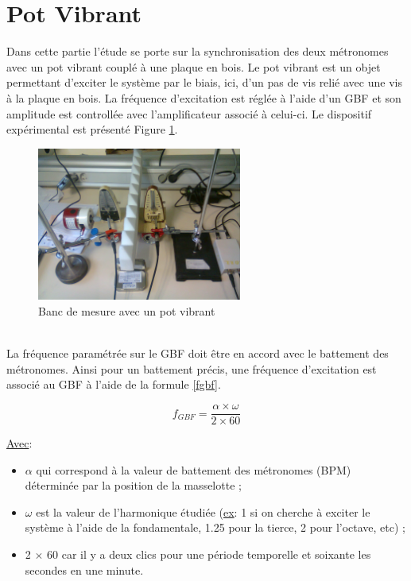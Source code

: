 \documentclass[a4paper,11pt]{report}
\begin{document}
\section{Pot Vibrant}
Dans cette partie l'étude se porte sur la synchronisation des deux métronomes avec un pot vibrant couplé à une plaque en bois. Le pot vibrant est un objet permettant d'exciter le système par le biais, ici, d'un pas de vis relié avec une vis à la plaque en bois. La fréquence d'excitation est réglée à l'aide d'un GBF et son amplitude est controllée avec l'amplificateur associé à celui-ci. Le dispositif expérimental est présenté Figure \ref{BancPot}.\\
\begin{figure}[h]
\centering
\includegraphics[width=0.6\textwidth]{Bancpotvibrant}
\caption{Banc de mesure avec un pot vibrant}\label{BancPot}
\end{figure}\\
La fréquence paramétrée sur le GBF doit être en accord avec le battement des métronomes. Ainsi pour un battement précis, une fréquence d'excitation est associé au GBF à l'aide de la formule \ref{fgbf}.

\begin{equation}
f_{GBF}=\frac{\alpha \times \omega}{2 \times 60}
\label{fgbf}
\end{equation}

\underline{Avec}:\\
\begin{itemize}[label=\textbullet, leftmargin=* ,parsep=0cm,itemsep=0cm,topsep=0cm,font=\tiny]
\item $\alpha$ qui correspond à la valeur de battement des métronomes (BPM) déterminée par la position de la masselotte ;
\item $\omega$ est la valeur de l'harmonique étudiée (\underline{ex}: 1 si on cherche à exciter le système à l'aide de la fondamentale, 1.25 pour la tierce, 2 pour l'octave, etc) ;
\item 2 $\times$ 60 car il y a deux clics pour une période temporelle et soixante les secondes en une minute.\\
\end{itemize}
\end{document}

